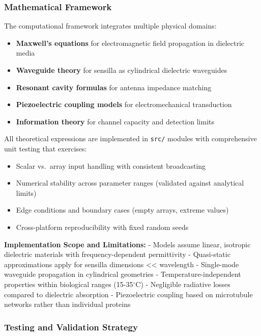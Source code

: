 \documentclass[
  13pt,
  a4paperpaper,
  12pt]{article}
\newcommand{\passthrough}[1]{#1}
\providecommand{\tightlist}{%
  \setlength{\itemsep}{0pt}\setlength{\parskip}{0pt}}
\begin{document}
\subsubsection{Mathematical Framework}\label{mathematical-framework}

The computational framework integrates multiple physical domains:

\begin{itemize}
\tightlist
\item
  \textbf{Maxwell's equations} for electromagnetic field propagation in
  dielectric media
\item
  \textbf{Waveguide theory} for sensilla as cylindrical dielectric
  waveguides
\item
  \textbf{Resonant cavity formulas} for antenna impedance matching
\item
  \textbf{Piezoelectric coupling models} for electromechanical
  transduction
\item
  \textbf{Information theory} for channel capacity and detection limits
\end{itemize}

All theoretical expressions are implemented in
\passthrough{\lstinline!src/!} modules with comprehensive unit testing
that exercises:

\begin{itemize}
\tightlist
\item
  Scalar vs.~array input handling with consistent broadcasting
\item
  Numerical stability across parameter ranges (validated against
  analytical limits)
\item
  Edge conditions and boundary cases (empty arrays, extreme values)
\item
  Cross-platform reproducibility with fixed random seeds
\end{itemize}

\textbf{Implementation Scope and Limitations:} - Models assume linear,
isotropic dielectric materials with frequency-dependent permittivity -
Quasi-static approximations apply for sensilla dimensions
\textless\textless{} wavelength - Single-mode waveguide propagation in
cylindrical geometries - Temperature-independent properties within
biological ranges (15-35\(^{\circ}\mathrm{C}\)) - Negligible radiative
losses compared to dielectric absorption - Piezoelectric coupling based
on microtubule networks rather than individual proteins

\subsubsection{Testing and Validation
Strategy}\label{testing-and-validation-strategy}
\end{document}
